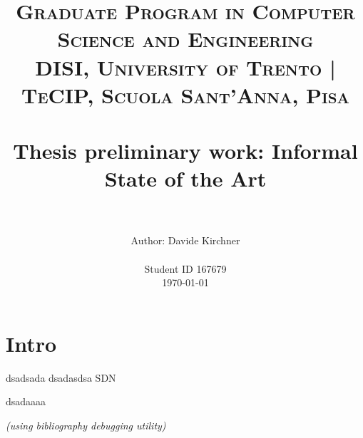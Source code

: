 \documentclass[paper=a4, fontsize=11pt]{scrartcl}
\title{
        \vspace{-1in}
        \usefont{OT1}{bch}{b}{n}
        \normalfont \normalsize \textsc{Graduate Program in Computer Science and Engineering} \\
	\normalfont \normalsize \textsc{DISI, University of Trento | TeCIP, Scuola Sant'Anna, Pisa} \\ [25pt] %
        \horrule{0.5pt} \\[0.4cm]
        \huge Thesis preliminary work: Informal State of the Art \\
        \horrule{2pt} \\[0.5cm]
}
\author{
        \normalfont                                 \normalsize
        Author: Davide Kirchner \\[-3pt]  \normalsize
        \mono{davide.kirchner@yahoo.it}\\[-3pt]     \normalsize
        Student ID 167679\\[-3pt]     \normalsize
        \today
}
\date{}
\begin{document}
\maketitle

\setcounter{tocdepth}{3}


\section{Intro}

dsadsada dsadasdsa \gls{SDN}

dsadaaaa

\nocite{*}  \vspace{20pt} \hspace{-14pt} \emph{\small(using bibliography debugging utility)} \vspace{-20pt}



\printglossaries

\begin{comment}
\begin{figure}
  \centering
  \texttt{[image: img/tasks\_resources\_diagram.pdf]}
  \caption{\label{fig:architecture} A representation of the interactions among the spawned threads. Note that, other than the ones here represented, the periodic tasks themselves may have extra dependencies and interactions, according to the provided description file.}
\end{figure}
\end{comment}

\begin{comment}
\begin{figure}
  \begin{minipage}[b]{.5\linewidth}
    \texttt{[image: images/delivery\_9-Y.png]}
    \subcaption{\label{fig:delivery:a}Node 9 sending to the yellow group.}
  \end{minipage}%
  \begin{minipage}[b]{.5\linewidth}
    \texttt{[image: images/delivery\_3-R.png]}
    \subcaption{\label{fig:delivery:b}Node 3 sending to the red group.}
  \end{minipage}
  \caption{\label{fig:delivery}Color-scale representation of the delivery ratio at the target nodes.}
\end{figure}
\end{comment}
\end{document}
